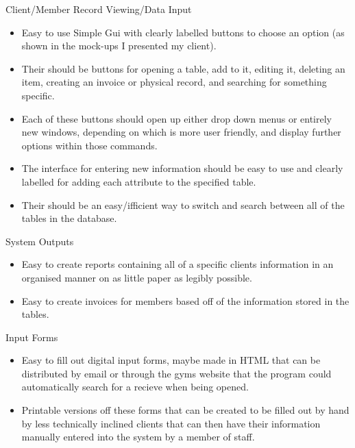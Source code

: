Client/Member Record Viewing/Data Input

\begin{itemize}  

        \item Easy to use Simple Gui with clearly labelled buttons to choose an option (as shown in the mock-ups I presented my client).
        \item Their should be buttons for opening a table, add to it, editing it, deleting an item, creating an invoice or physical record, and searching for something specific.
        \item Each of these buttons should open up either drop down menus or entirely new windows, depending on which is more user friendly, and display further options within those commands.
        \item The interface for entering new information should be easy to use and clearly labelled for adding each attribute to the specified table.
        \item Their should be an easy/ifficient way to switch and search between all of the tables in the database.
    \end{itemize}


System Outputs

\begin{itemize}  

        \item Easy to create reports containing all of a specific clients information in an organised manner on as little paper as legibly possible.
        \item Easy to create invoices for members based off of the information stored in the tables.
\end{itemize}

Input Forms

    \begin{itemize}  

        \item Easy to fill out digital input forms, maybe made in HTML that can be distributed by email or through the gyms website that the program could automatically search for a recieve when being opened.
        \item Printable versions off these forms that can be created to be filled out by hand by less technically inclined clients that can then have their information manually entered into the system by a member of staff.

    \end{itemize}

